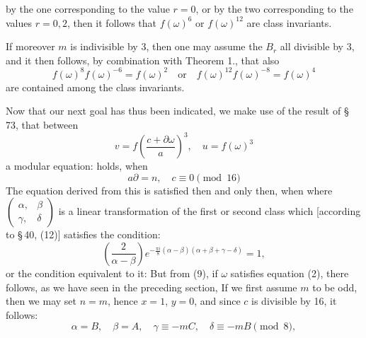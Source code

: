 

by the one corresponding to the value $r=0$, or by the two corresponding to the values $r=0,2$, then it follows that $f(\omega)^6$ or $f(\omega)^{12}$ are class invariants.

If moreover $m$ is indivisible by 3, then one may assume the $B_r$ all divisible by 3, and it then follows, by combination with Theorem 1., that also
\[
f(\omega)^8f(\omega)^{-6}=f(\omega)^2 \quad\text{or}\quad f(\omega)^{12}f(\omega)^{-8}=f(\omega)^4
\]
are contained among the class invariants.

Now that our next goal has thus been indicated, we make use of the result of \S\,73, that between
\[
v=f\!\left(\frac{c+\partial\omega}{a}\right)^{3},\quad u=f(\omega)^3
\]
a modular equation:
holds, when
\[
a\partial=n,\quad c\equiv 0\pmod{16}
\]
The equation derived from this
is satisfied then and only then, when
where $\begin{pmatrix}\alpha, & \beta\\ \gamma, & \delta\end{pmatrix}$ is a linear transformation of the first or second class which [according to \S\,40, (12)] satisfies the condition:
\[
\left(\frac{2}{\alpha-\beta}\right)e^{-\frac{\pi i}{8}(\alpha-\beta)(\alpha+\beta+\gamma-\delta)}=1,
\]
or the condition equivalent to it:
But from (9), if $\omega$ satisfies equation (2), there follows, as we have seen in the preceding section,
If we first assume $m$ to be odd, then we may set $n=m$, hence $x=1$, $y=0$, and since $c$ is divisible by 16, it follows:
\[
\alpha=B,\quad \beta=A,\quad \gamma\equiv -mC,\quad \delta\equiv -mB\pmod{8},
\]
